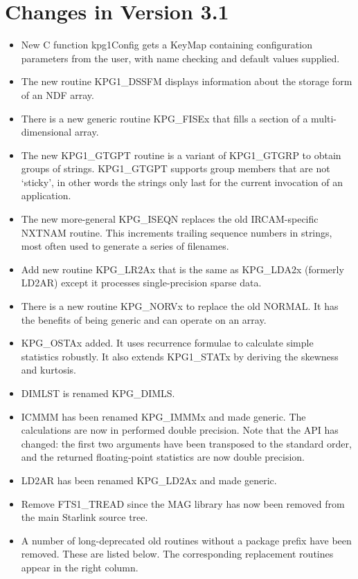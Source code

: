 \section{Changes in Version 3.1}
\begin{itemize}
\item New C function kpg1Config gets a KeyMap containing configuration
      parameters from the user, with name checking and default values
      supplied.
\item The new routine KPG1\_DSSFM displays information about the storage
      form of an NDF array.
\item There is a new generic routine KPG\_FISEx that fills a section
      of a multi-dimensional array.
\item The new KPG1\_GTGPT routine is a variant of KPG1\_GTGRP to obtain
      groups of strings.  KPG1\_GTGPT supports group members that are not
      `sticky', in other words the strings only last for the current
      invocation of an application.
\item The new more-general KPG\_ISEQN replaces the old IRCAM-specific
      NXTNAM routine.  This increments trailing sequence numbers
      in strings, most often used to generate a series of filenames.
\item Add new routine KPG\_LR2Ax that is the same as KPG\_LDA2x
      (formerly LD2AR) except it processes single-precision sparse data.
\item There is a new routine KPG\_NORVx to replace the old NORMAL.  It
      has the benefits of being generic and can operate on an array.
\item KPG\_OSTAx added.  It uses recurrence formulae to calculate
      simple statistics robustly.  It also extends KPG1\_STATx by
      deriving the skewness and kurtosis.

\item DIMLST is renamed KPG\_DIMLS.
\item ICMMM has been renamed KPG\_IMMMx and made generic.  The
      calculations are now in performed double precision.  Note that
      the API has changed: the first two arguments have been transposed
      to the standard order, and the returned floating-point statistics
      are now double precision.
\item LD2AR has been renamed KPG\_LD2Ax and made generic.

\item Remove FTS1\_TREAD since the MAG library has now been removed
      from the main Starlink source tree.
\item A number of long-deprecated old routines without a package prefix
      have been removed.  These are listed below.  The corresponding
      replacement routines appear in the right column.


\end{itemize}
